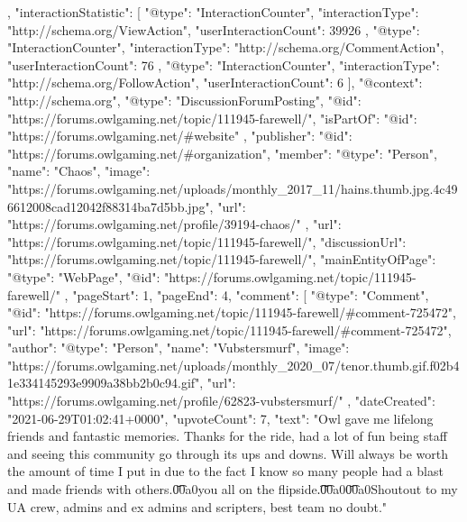 {{    },
    "interactionStatistic": [
        {
            "@type": "InteractionCounter",
            "interactionType": "http://schema.org/ViewAction",
            "userInteractionCount": 39926
        },
        {
            "@type": "InteractionCounter",
            "interactionType": "http://schema.org/CommentAction",
            "userInteractionCount": 76
        },
        {
            "@type": "InteractionCounter",
            "interactionType": "http://schema.org/FollowAction",
            "userInteractionCount": 6
        }
    ],
    "@context": "http://schema.org",
    "@type": "DiscussionForumPosting",
    "@id": "https://forums.owlgaming.net/topic/111945-farewell/",
    "isPartOf": {
        "@id": "https://forums.owlgaming.net/#website"
    },
    "publisher": {
        "@id": "https://forums.owlgaming.net/#organization",
        "member": {
            "@type": "Person",
            "name": "Chaos",
            "image": "https://forums.owlgaming.net/uploads/monthly_2017_11/hains.thumb.jpg.4c496612008cad12042f88314ba7d5bb.jpg",
            "url": "https://forums.owlgaming.net/profile/39194-chaos/"
        }
    },
    "url": "https://forums.owlgaming.net/topic/111945-farewell/",
    "discussionUrl": "https://forums.owlgaming.net/topic/111945-farewell/",
    "mainEntityOfPage": {
        "@type": "WebPage",
        "@id": "https://forums.owlgaming.net/topic/111945-farewell/"
    },
    "pageStart": 1,
    "pageEnd": 4,
    "comment": [
        {
            "@type": "Comment",
            "@id": "https://forums.owlgaming.net/topic/111945-farewell/#comment-725472",
            "url": "https://forums.owlgaming.net/topic/111945-farewell/#comment-725472",
            "author": {
                "@type": "Person",
                "name": "Vubstersmurf",
                "image": "https://forums.owlgaming.net/uploads/monthly_2020_07/tenor.thumb.gif.f02b41e334145293e9909a38bb2b0c94.gif",
                "url": "https://forums.owlgaming.net/profile/62823-vubstersmurf/"
            },
            "dateCreated": "2021-06-29T01:02:41+0000",
            "upvoteCount": 7,
            "text": "Owl gave me lifelong friends and fantastic memories. Thanks for the ride, had a lot of fun being staff and seeing this community go through its ups and downs. Will always be worth the amount of time I put in due to the fact I know so many people had a blast and made friends with others.\n \n\n\n\t\u00a0\n \n\n\n\tCatch you all on the flipside.\n \n\n\n\t \n\n\n\t\u00a0\n \n\n\n\t\u00a0\n \n\n\n\tps Shoutout to my UA crew, admins and ex admins and scripters, best team no doubt.\n \n"
}}
